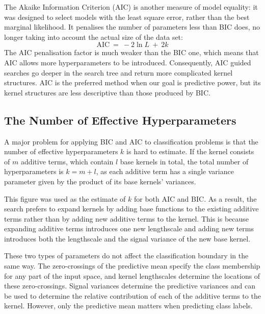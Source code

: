 \documentclass[a4paper,12pt ]{report}
\begin{document}
The Akaike Information Criterion (AIC) is another measure of model equality: it was designed to select models with the least square error, rather than the best marginal likelihood. It penalises the number of parameters less than BIC does, no longer taking into account the actual size of the data set:
\begin{equation*} \mathrm{AIC} ~=~ - 2 \ln L ~+~ 2 k \end{equation*}
The AIC penalisation factor is much weaker than the BIC one, which means that AIC allows more hyperparameters to be introduced. Consequently, AIC guided searches go deeper in the search tree and return more complicated kernel structures. AIC is the preferred method when our goal is predictive power, but its kernel structures are less descriptive than those produced by BIC. %

\subsection{The Number of Effective Hyperparameters}

A major problem for applying BIC and AIC to classification problems is that the number of effective hyperparameters $k$ is hard to estimate. If the kernel consists of $m$ additive terms, which contain $l$ base {\SE} kernels in total, the total number of hyperparameters is $k = m + l$, as each additive term has a single variance parameter given by the product of its base kernels' variances.

This figure was used as the estimate of $k$ for both AIC and BIC. As a result, the search prefers to expand kernels by adding base functions to the existing additive terms rather than by adding new additive terms to the kernel. This is because expanding additive terms introduces one new lengthscale and adding new terms introduces both the lengthscale and the signal variance of the new base kernel.

These two types of parameters do not affect the classification boundary in the same way. The zero-crossings of the predictive mean specify the class membership for any part of the input space, and kernel lengthscales determine the locations of these zero-crossings. Signal variances determine the predictive variances and can be used to determine the relative contribution of each of the additive terms to the kernel. However, only the predictive mean matters when predicting class labels.
\end{document}
